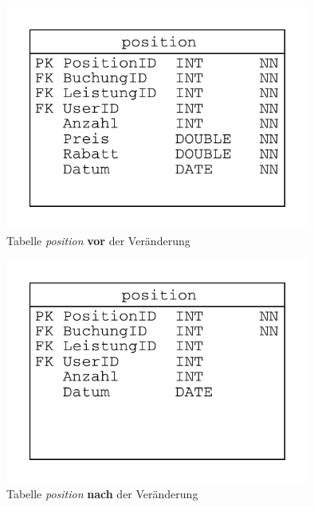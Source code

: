 \documentclass[11pt,twoside,a4paper]{article}
\begin{document}
	\begin{figure}
		\includegraphics[width=10cm]{erd_position_orig}
		\caption{Tabelle \textit{position} \textbf{vor} der Veränderung \label{fig:poso}}
	\end{figure}
	
	\begin{figure}
		\includegraphics[width=10cm]{erd_position_change}
		\caption{Tabelle \textit{position} \textbf{nach} der Veränderung \label{fig:posc}}
	\end{figure}
\end{document}
